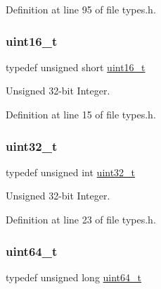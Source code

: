Definition at line 95 of file types.\+h.

\mbox{\label{a00125_a273cf69d639a59973b6019625df33e30_a273cf69d639a59973b6019625df33e30}} 
\subsubsection{\texorpdfstring{uint16\+\_\+t}{uint16\_t}}
{\footnotesize\ttfamily typedef unsigned short \hyperlink{a00125_a273cf69d639a59973b6019625df33e30_a273cf69d639a59973b6019625df33e30}{uint16\+\_\+t}}



Unsigned 32-\/bit Integer. 



Definition at line 15 of file types.\+h.

\mbox{\label{a00125_a435d1572bf3f880d55459d9805097f62_a435d1572bf3f880d55459d9805097f62}} 
\subsubsection{\texorpdfstring{uint32\+\_\+t}{uint32\_t}}
{\footnotesize\ttfamily typedef unsigned int \hyperlink{a00125_a435d1572bf3f880d55459d9805097f62_a435d1572bf3f880d55459d9805097f62}{uint32\+\_\+t}}



Unsigned 32-\/bit Integer. 



Definition at line 23 of file types.\+h.

\mbox{\label{a00125_aa232ecf786a74ce5363c36c10798d2b1_aa232ecf786a74ce5363c36c10798d2b1}} 
\subsubsection{\texorpdfstring{uint64\+\_\+t}{uint64\_t}}
{\footnotesize\ttfamily typedef unsigned long \hyperlink{a00125_aa232ecf786a74ce5363c36c10798d2b1_aa232ecf786a74ce5363c36c10798d2b1}{uint64\+\_\+t}}



